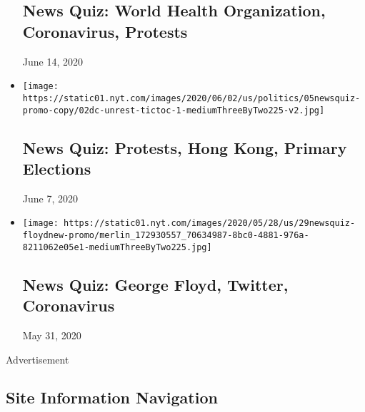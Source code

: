 \begin{itemize}
  \hypertarget{news-quiz-world-health-organization-coronavirus-protests}{%
  \subsection{News Quiz: World Health Organization, Coronavirus,
  Protests}\label{news-quiz-world-health-organization-coronavirus-protests}}

  June 14, 2020
\item
  \href{https://www.nytimes.com/interactive/2020/06/05/briefing/protests-hong-kong-primary-elections-news-quiz.html}{}

  \texttt{[image: https://static01.nyt.com/images/2020/06/02/us/politics/05newsquiz-promo-copy/02dc-unrest-tictoc-1-mediumThreeByTwo225-v2.jpg]}

  \hypertarget{news-quiz-protests-hong-kong-primary-elections}{%
  \subsection{News Quiz: Protests, Hong Kong, Primary
  Elections}\label{news-quiz-protests-hong-kong-primary-elections}}

  June 7, 2020
\item
  \href{https://www.nytimes.com/interactive/2020/05/29/briefing/george-floyd-twitter-coronavirus-news-quiz.html}{}

  \texttt{[image: https://static01.nyt.com/images/2020/05/28/us/29newsquiz-floydnew-promo/merlin\_172930557\_70634987-8bc0-4881-976a-8211062e05e1-mediumThreeByTwo225.jpg]}

  \hypertarget{news-quiz-george-floyd-twitter-coronavirus}{%
  \subsection{News Quiz: George Floyd, Twitter,
  Coronavirus}\label{news-quiz-george-floyd-twitter-coronavirus}}

  May 31, 2020
\end{itemize}

Advertisement

\hypertarget{site-information-navigation}{%
\subsection{Site Information
Navigation}\label{site-information-navigation}}

